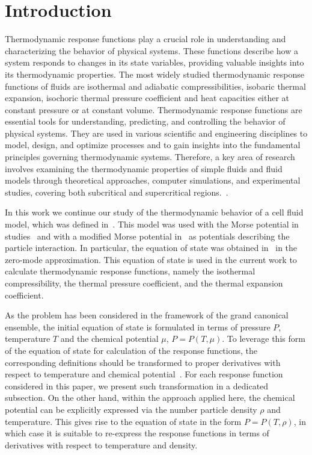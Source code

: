 \section{Introduction}

Thermodynamic response functions play a crucial role in understanding and characterizing the behavior of physical systems. These functions describe how a system responds to changes in its state variables, providing valuable insights into its thermodynamic properties. The most widely studied thermodynamic response functions of fluids are isothermal and adiabatic compressibilities, isobaric thermal expansion, isochoric thermal pressure coefficient and heat capacities either at constant pressure or at constant volume. Thermodynamic response functions are essential tools for understanding, predicting, and controlling the behavior of physical systems. They are used in various scientific and engineering disciplines to model, design, and optimize processes and to gain insights into the fundamental principles governing thermodynamic systems. Therefore, a key area of research involves examining the thermodynamic properties of simple fluids and fluid models through theoretical approaches, computer simulations, and experimental studies, covering both subcritical and supercritical regions.~\cite{Johnston2014book,YigzaweSadus2013,Velasco2011,Bulavin2024}. 


In this work we continue our study of the thermodynamic behavior of a cell fluid model, which was defined in~\cite{KozitskyKozlovskiiDobush2018book,KozitskyKozlovskiiDobush2020}. This model was used with the Morse potential in studies~\cite{PylyukEtAlJML2023,PylyukKozlovskiiDobushUJP2023b} and with a modified Morse potential in~\cite{KozlovskiiDobush2020,PylyukDobush2020} as potentials describing the particle interaction. In particular, the equation of state was obtained in~\cite{KozlovskiiDobush2020} in the zero-mode approximation. This equation of state is used in the current work to calculate thermodynamic response functions, namely the isothermal compressibility, the thermal pressure coefficient, and the thermal expansion coefficient. 

As the problem has been considered in the framework of the grand canonical ensemble, the initial equation of state is formulated in terms of pressure $P$, temperature $T$ and the chemical potential $\mu$, $P = P(T,\mu)$. To leverage this form of the equation of state for calculation of the response functions, the corresponding definitions should be transformed to proper derivatives with respect to temperature and chemical potential~\cite{StrokerMeier2021}. For each response function considered in this paper, we present such transformation in a dedicated subsection. On the other hand, within the approach applied here, the chemical potential can be explicitly expressed via the number particle density $\rho$ and temperature. This gives rise to the equation of state in the form $P = P(T, \rho)$, in which case it is suitable to re-express the response functions in terms of derivatives with respect to temperature and density.

